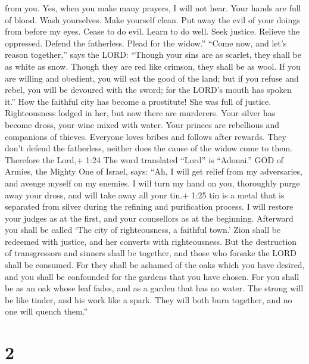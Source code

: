 from you. Yes, when you make many prayers, I will not hear. Your hands
are full of blood.  Wash yourselves. Make yourself clean.
Put away the evil of your doings from before my eyes. Cease to do evil.
 Learn to do well. Seek justice. Relieve the oppressed.
Defend the fatherless. Plead for the widow.''  ``Come now,
and let's reason together,'' says the LORD: ``Though your sins are as
scarlet, they shall be as white as snow. Though they are red like
crimson, they shall be as wool.  If you are willing and
obedient, you will eat the good of the land;  but if you
refuse and rebel, you will be devoured with the sword; for the LORD's
mouth has spoken it.''  How the faithful city has become a
prostitute! She was full of justice. Righteousness lodged in her, but
now there are murderers.  Your silver has become dross,
your wine mixed with water.  Your princes are rebellious
and companions of thieves. Everyone loves bribes and follows after
rewards. They don't defend the fatherless, neither does the cause of the
widow come to them.  Therefore the Lord,+ 1:24 The word
translated ``Lord'' is ``Adonai.'' GOD of Armies, the Mighty One of
Israel, says: ``Ah, I will get relief from my adversaries, and avenge
myself on my enemies.  I will turn my hand on you,
thoroughly purge away your dross, and will take away all your tin.+ 1:25
tin is a metal that is separated from silver during the refining and
purification process.  I will restore your judges as at the
first, and your counsellors as at the beginning. Afterward you shall be
called `The city of righteousness, a faithful town.'  Zion
shall be redeemed with justice, and her converts with righteousness.
 But the destruction of transgressors and sinners shall be
together, and those who forsake the LORD shall be consumed.
 For they shall be ashamed of the oaks which you have
desired, and you shall be confounded for the gardens that you have
chosen.  For you shall be as an oak whose leaf fades, and
as a garden that has no water.  The strong will be like
tinder, and his work like a spark. They will both burn together, and no
one will quench them.''

\hypertarget{section-1}{%
\section{2}\label{section-1}}

